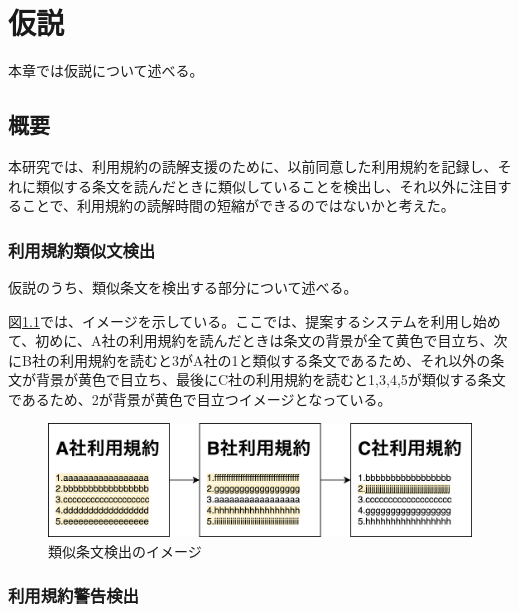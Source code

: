 \chapter{仮説}
\label{proposed}

本章では仮説について述べる。

\section{概要}
本研究では、利用規約の読解支援のために、以前同意した利用規約を記録し、それに類似する条文を読んだときに類似していることを検出し、それ以外に注目することで、利用規約の読解時間の短縮ができるのではないかと考えた。

\subsection{利用規約類似文検出}
仮説のうち、類似条文を検出する部分について述べる。

図\ref{img:demo}では、イメージを示している。ここでは、提案するシステムを利用し始めて、初めに、A社の利用規約を読んだときは条文の背景が全て黄色で目立ち、次にB社の利用規約を読むと3がA社の1と類似する条文であるため、それ以外の条文が背景が黄色で目立ち、最後にC社の利用規約を読むと1,3,4,5が類似する条文であるため、2が背景が黄色で目立つイメージとなっている。
\label{sub:利用規約類似文検出}
\begin{figure}[h]
  \begin{center}
      \includegraphics[width=15cm]{img/demo.drawio.png}
      \caption{類似条文検出のイメージ}
      \label{img:demo}
  \end{center}
\end{figure}

\subsection{利用規約警告検出}
\label{sub:利用規約警告検出}

